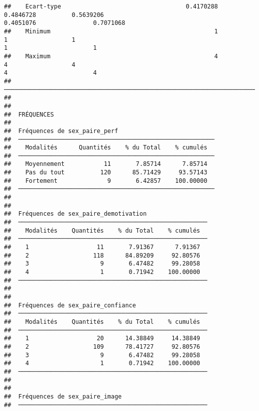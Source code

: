 \documentclass[
]{article}
\begin{document}
\begin{verbatim}
##    Ecart-type                                   0.4170288              0.4846728          0.5639206                                                                                        0.4051076                0.7071068   
##    Minimum                                              1                      1                  1                                                                                                1                        1   
##    Maximum                                              4                      4                  4                                                                                                4                        4   
##  ────────────────────────────────────────────────────────────────────────────────────────────────────────────────────────────────────────────────────────────────────────────────────────────────────────────────────────────── 
## 
## 
##  FRÉQUENCES
## 
##  Fréquences de sex_paire_perf                            
##  ─────────────────────────────────────────────────────── 
##    Modalités      Quantités    % du Total    % cumulés   
##  ─────────────────────────────────────────────────────── 
##    Moyennement           11       7.85714      7.85714   
##    Pas du tout          120      85.71429     93.57143   
##    Fortement              9       6.42857    100.00000   
##  ─────────────────────────────────────────────────────── 
## 
## 
##  Fréquences de sex_paire_demotivation                  
##  ───────────────────────────────────────────────────── 
##    Modalités    Quantités    % du Total    % cumulés   
##  ───────────────────────────────────────────────────── 
##    1                   11       7.91367      7.91367   
##    2                  118      84.89209     92.80576   
##    3                    9       6.47482     99.28058   
##    4                    1       0.71942    100.00000   
##  ───────────────────────────────────────────────────── 
## 
## 
##  Fréquences de sex_paire_confiance                     
##  ───────────────────────────────────────────────────── 
##    Modalités    Quantités    % du Total    % cumulés   
##  ───────────────────────────────────────────────────── 
##    1                   20      14.38849     14.38849   
##    2                  109      78.41727     92.80576   
##    3                    9       6.47482     99.28058   
##    4                    1       0.71942    100.00000   
##  ───────────────────────────────────────────────────── 
## 
## 
##  Fréquences de sex_paire_image                         
##  ───────────────────────────────────────────────────── 

\end{verbatim}
\end{document}
